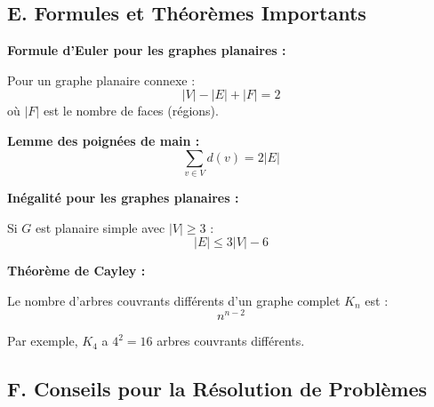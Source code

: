 \documentclass[12pt,a4paper]{article}
\begin{document}
\newpage
\subsection*{E. Formules et Théorèmes Importants}

\begin{astuce}
\textbf{Formule d'Euler pour les graphes planaires :}

Pour un graphe planaire connexe :
$$|V| - |E| + |F| = 2$$
où $|F|$ est le nombre de faces (régions).

\textbf{Lemme des poignées de main :}
$$\sum_{v \in V} d(v) = 2|E|$$

\textbf{Inégalité pour les graphes planaires :}

Si $G$ est planaire simple avec $|V| \geq 3$ :
$$|E| \leq 3|V| - 6$$

\textbf{Théorème de Cayley :}

Le nombre d'arbres couvrants différents d'un graphe complet $K_n$ est :
$$n^{n-2}$$

Par exemple, $K_4$ a $4^2 = 16$ arbres couvrants différents.
\end{astuce}

\newpage
\subsection*{F. Conseils pour la Résolution de Problèmes}
\end{document}
